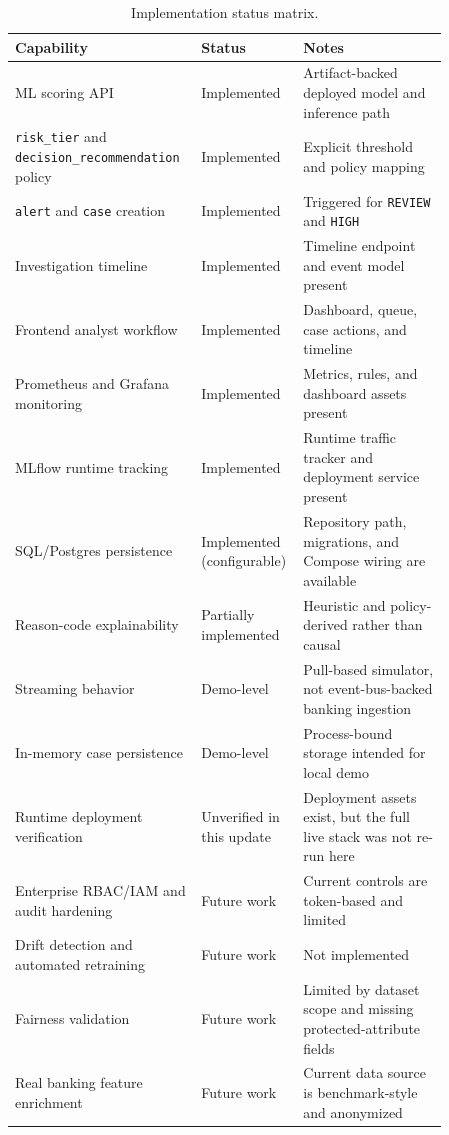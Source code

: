 \documentclass[11pt]{article}
\newcommand{\code}[1]{\texttt{#1}}
\begin{document}
\begin{table}[H]
\centering
\begin{tabular}{p{0.38\linewidth}p{0.16\linewidth}p{0.32\linewidth}}
\toprule
Capability & Status & Notes \\
\midrule
ML scoring API & Implemented & Artifact-backed deployed model and inference path \\
\code{risk_tier} and \code{decision_recommendation} policy & Implemented & Explicit threshold and policy mapping \\
\code{alert} and \code{case} creation & Implemented & Triggered for \code{REVIEW} and \code{HIGH} \\
Investigation timeline & Implemented & Timeline endpoint and event model present \\
Frontend analyst workflow & Implemented & Dashboard, queue, case actions, and timeline \\
Prometheus and Grafana monitoring & Implemented & Metrics, rules, and dashboard assets present \\
MLflow runtime tracking & Implemented & Runtime traffic tracker and deployment service present \\
SQL/Postgres persistence & Implemented (configurable) & Repository path, migrations, and Compose wiring are available \\
Reason-code explainability & Partially implemented & Heuristic and policy-derived rather than causal \\
Streaming behavior & Demo-level & Pull-based simulator, not event-bus-backed banking ingestion \\
In-memory case persistence & Demo-level & Process-bound storage intended for local demo \\
Runtime deployment verification & Unverified in this update & Deployment assets exist, but the full live stack was not re-run here \\
Enterprise RBAC/IAM and audit hardening & Future work & Current controls are token-based and limited \\
Drift detection and automated retraining & Future work & Not implemented \\
Fairness validation & Future work & Limited by dataset scope and missing protected-attribute fields \\
Real banking feature enrichment & Future work & Current data source is benchmark-style and anonymized \\
\bottomrule
\end{tabular}
\caption{Implementation status matrix.}
\end{table}
\end{document}
